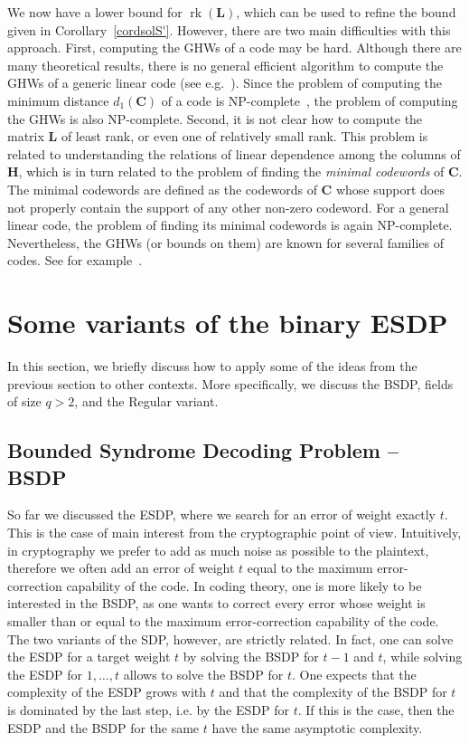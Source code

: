 \documentclass[11pt]{article}
\theoremstyle{plain}
\theoremstyle{definition}
\theoremstyle{remark}
\begin{document}
We now have a lower bound for $\operatorname{rk}(\mathbf{L})$, which can be used to refine the bound given in Corollary~\ref{cordsolS'}. However, there are two main difficulties with this approach. First, computing the GHWs of a code may be hard. Although there are many theoretical results, there is no general efficient algorithm to compute the GHWs of a generic linear code (see e.g.~\cite{10.1145/3773284}). Since the problem of computing the minimum distance $d_1(\mathbf{C})$ of a code is NP-complete~\cite{1055873}, the problem of computing the GHWs is also NP-complete. Second, it is not clear how to compute the matrix $\mathbf{L}$ of least rank, or even one of relatively small rank. This problem is related to understanding the relations of linear dependence among the columns of $\mathbf{H}$, which is in turn related to the problem of finding the \textit{minimal codewords} of $\mathbf{C}$. The minimal codewords are defined as the codewords of $\mathbf{C}$ whose support does not properly contain the support of any other non-zero codeword. For a general linear code, the problem of finding its minimal codewords is again NP-complete. Nevertheless, the GHWs (or bounds on them) are known for several families of codes. See for example~\cite{133259,135653,651015,LEE2015265, KangquanLi2022AdvancesinMathematicsofCommunications}.

\section{Some variants of the binary ESDP}\label{secVariants}

In this section, we briefly discuss how to apply some of the ideas from the previous section to other contexts. More specifically, we discuss the BSDP, fields of size $q>2$, and the Regular variant.

\subsection{Bounded Syndrome Decoding Problem -- BSDP}\label{secBSDP}
So far we discussed the ESDP, where we search for an error of weight exactly $t$. This is the case of main interest from the cryptographic point of view. Intuitively, in cryptography we prefer to add as much noise as possible to the plaintext, therefore we often add an error of weight $t$ equal to the maximum error-correction capability of the code. In coding theory, one is more likely to be interested in the BSDP, as one wants to correct every error whose weight is smaller than or equal to the maximum error-correction capability of the code. The two variants of the SDP, however, are strictly related. In fact, one can solve the ESDP for a target weight $t$ by solving the BSDP for $t-1$ and $t$, while solving the ESDP for $1,\dots,t$ allows to solve the BSDP for $t$. One expects that the complexity of the ESDP grows with $t$ and that the complexity of the BSDP for $t$ is dominated by the last step, i.e. by the ESDP for $t$. If this is the case, then the ESDP and the BSDP for the same $t$ have the same asymptotic complexity.
\end{document}
